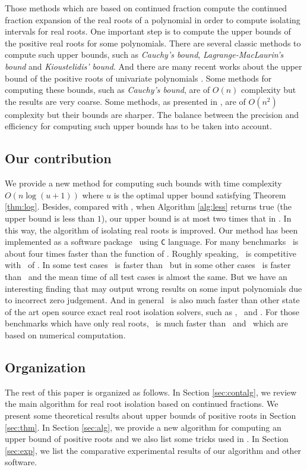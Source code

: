 Those methods which are based on  continued fraction compute the continued fraction expansion of the real roots of a polynomial in order to  compute isolating intervals for real roots. One important step
is to  compute the upper bounds of the positive real roots for some polynomials. There are  several classic methods to compute such upper bounds, such as {\em Cauchy's bound}, {\em Lagrange-MacLaurin's  bound} and {\em Kioustelidis' bound}. And there are many recent works about the upper bound of the positive roots of univariate polynomials \cite{hong98,ste05,akr08}. Some methods for computing these bounds,  such as {\em Cauchy's bound}, are of $O(n)$ complexity but the results are very coarse. Some methods, as presented in  \cite{akr08}, are of $O(n^2)$ complexity but their bounds are sharper. The balance between the precision and efficiency for computing such upper bounds has to be taken into account.
\subsection{Our contribution}
We provide a new method for computing such bounds with time complexity $O(n\log(u+1))$ %
where $u$ is the optimal upper bound satisfying Theorem \ref{thm:log}. Besides, compared
with \cite{akr08}, when  Algorithm \ref{alg:less} returns true (the upper bound is less than $1$), our upper bound is at most two times that in \cite{akr08}. In this way, the algorithm of   isolating real roots is improved.  Our  method has been implemented as a  software package \froot\ using \texttt{C} language. For many benchmarks \froot \  is about four  times
faster   than  the function {\tt \REALROOT} of \MAPLE. Roughly speaking, \froot\ is competitive with \inte\ of \MM. In some test cases \froot\ is faster than \inte\ but in some other cases \inte\ is faster than \froot\ and the mean time of all test cases is almost the same. But we have an interesting finding that {\tt \inte} may output wrong results on some input polynomials due to incorrect zero judgement. %
And in general \froot\ is also much faster than other state of the art
open source exact real root isolation solvers, such as \cf, \AND\ and \SLV. For those  benchmarks which  have only real roots, \froot\ is much faster than \sle\ and \eign\ which are based on numerical computation.

\subsection{Organization}

The rest of this paper is organized as follows. In Section \ref{sec:contalg}, we review the
main algorithm for real root isolation based on  continued fractions. We present some theoretical results about upper bounds of positive roots in Section \ref{sec:thm}.  In Section \ref{sec:alg}, we provide a new algorithm for
computing an upper bound of positive roots and we also list some tricks used in \froot.  In Section \ref{sec:exp}, we  list the comparative experimental results of our algorithm and other software.
